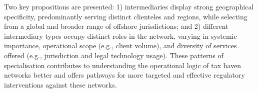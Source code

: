 \documentclass[12pt, a4paper]{report}
\begin{document}
Two key propositions are presented: 1) intermediaries display strong geographical specificity, predominantly serving distinct clienteles and regions, while selecting from a global and broader range of offshore jurisdictions; and 2) different intermediary types occupy distinct roles in the network, varying in systemic importance, operational scope (e.g., client volume), and diversity of services offered (e.g., jurisdiction and legal technology usage). These patterns of specialisation contributes to understanding the operational logic of tax haven networks better and offers pathways for more targeted and effective regulatory interventions against these networks.

\pagestyle{fancy} %
\addtocounter{page}{-1} %








\appendix



\end{document}
